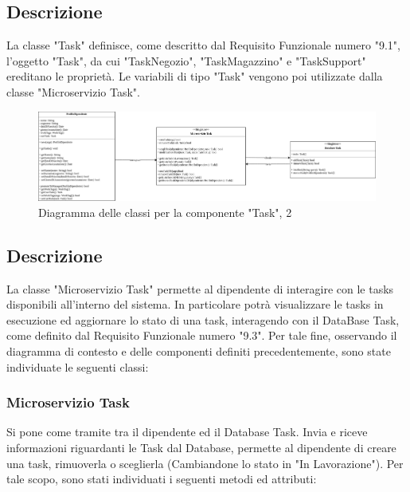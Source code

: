 \documentclass{report}
\begin{document}
\subsection*{Descrizione}
La classe "Task" definisce, come descritto dal Requisito Funzionale numero "9.1", l'oggetto "Task", da cui "TaskNegozio", "TaskMagazzino" e "TaskSupport" ereditano le proprietà. Le variabili di tipo "Task" vengono poi utilizzate dalla classe "Microservizio Task".


\begin{figure}[H]
	\centering\includegraphics[width=1.2\textwidth]{images/Diagramma_delle_classi_task2.png}
	Diagramma delle classi per la componente "Task", 2
\end{figure}
\subsection*{Descrizione}
La classe "Microservizio Task" permette al dipendente di interagire con le tasks disponibili all'interno del sistema. In particolare potrà visualizzare le tasks in esecuzione ed aggiornare lo stato di una task, interagendo con il DataBase Task, come definito dal Requisito Funzionale numero "9.3". Per tale fine, osservando il diagramma di contesto e delle componenti definiti precedentemente, sono state individuate le seguenti classi: 

\subsubsection*{Microservizio Task}
Si pone come tramite tra il dipendente ed il Database Task. Invia e riceve informazioni riguardanti le Task dal Database, permette al dipendente di creare una task, rimuoverla o sceglierla (Cambiandone lo stato in "In Lavorazione"). Per tale scopo, sono stati individuati i seguenti metodi ed attributi:
\end{document}

